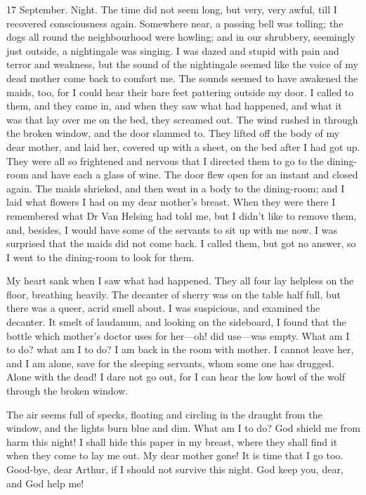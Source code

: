 \begin{diary}{17 September. Night.}
The time did not seem long, but very, very awful, till I recovered consciousness again. Somewhere near, a passing bell was tolling; the dogs all round the neighbourhood were howling; and in our shrubbery, seemingly just outside, a nightingale was singing. I was dazed and stupid with pain and terror and weakness, but the sound of the nightingale seemed like the voice of my dead mother come back to comfort me. The sounds seemed to have awakened the maids, too, for I could hear their bare feet pattering outside my door. I called to them, and they came in, and when they saw what had happened, and what it was that lay over me on the bed, they screamed out. The wind rushed in through the broken window, and the door slammed to. They lifted off the body of my dear mother, and laid her, covered up with a sheet, on the bed after I had got up. They were all so frightened and nervous that I directed them to go to the dining-room and have each a glass of wine. The door flew open for an instant and closed again. The maids shrieked, and then went in a body to the dining-room; and I laid what flowers I had on my dear mother's breast. When they were there I remembered what Dr Van Helsing had told me, but I didn't like to remove them, and, besides, I would have some of the servants to sit up with me now. I was surprised that the maids did not come back. I called them, but got no answer, so I went to the dining-room to look for them.

My heart sank when I saw what had happened. They all four lay helpless on the floor, breathing heavily. The decanter of sherry was on the table half full, but there was a queer, acrid smell about. I was suspicious, and examined the decanter. It smelt of laudanum, and looking on the sideboard, I found that the bottle which mother's doctor uses for her—oh! did use—was empty. What am I to do? what am I to do? I am back in the room with mother. I cannot leave her, and I am alone, save for the sleeping servants, whom some one has drugged. Alone with the dead! I dare not go out, for I can hear the low howl of the wolf through the broken window.

The air seems full of specks, floating and circling in the draught from the window, and the lights burn blue and dim. What am I to do? God shield me from harm this night! I shall hide this paper in my breast, where they shall find it when they come to lay me out. My dear mother gone! It is time that I go too. Good-bye, dear Arthur, if I should not survive this night. God keep you, dear, and God help me!
\end{diary}